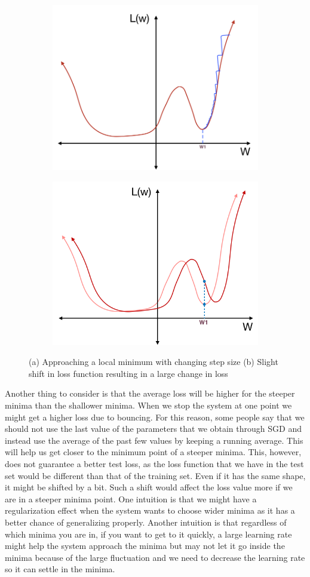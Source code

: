 \begin{figure}[hbt!]
\centering
\begin{subfigure}{.5\textwidth}
  \centering
  \includegraphics[width=.5\linewidth]{lectures/02-b/Learning rate_1.png}
  \caption{}
  \label{fig:learningrateSub1}
\end{subfigure}%
\begin{subfigure}{.5\textwidth}
  \centering
  \includegraphics[width=.5\linewidth]{lectures/02-b/Learning rate.png}
  \caption{}
  \label{fig:learningrateSub2}
\end{subfigure}
\caption{(a) Approaching a local minimum with changing step size (b) Slight shift in loss function resulting in a large change in loss}
\label{fig:learningrate2}
\end{figure}

Another thing to consider is that the average loss will be higher for the steeper minima than the shallower minima. When we stop the system at one point we might get a higher loss due to bouncing. For this reason, some people say that we should not use the last value of the parameters that we obtain through SGD and instead use the average of the past few values by keeping a running average. This will help us get closer to the minimum point of a steeper minima. This, however, does not guarantee a better test loss, as the loss function that we have in the test set would be different than that of the training set. Even if it has the same shape, it might be shifted by a bit. Such a shift would affect the loss value more if we are in a steeper minima point. One intuition is that we might have a regularization effect when the system wants to choose wider minima as it has a better chance of generalizing properly. Another intuition is that regardless of which minima you are in, if you want to get to it quickly, a large learning rate might help the system approach the minima but may not let it go inside the minima because of the large fluctuation and we need to decrease the learning rate so it can settle in the minima.\\


